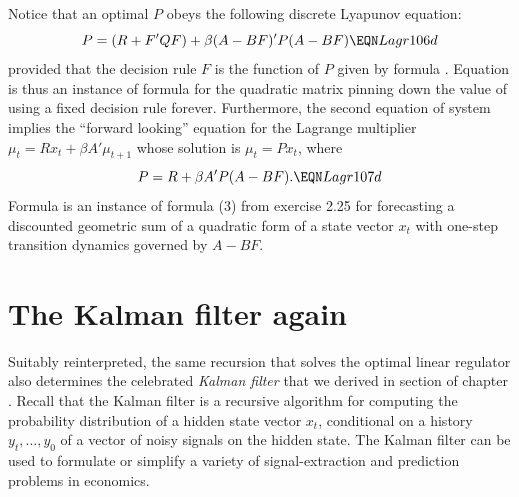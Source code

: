 Notice that an optimal $P$ obeys the following  discrete Lyapunov equation:
$$ P = (R + F' Q F) + \beta (A - B F)' P (A - BF)  \EQN Lagr106d $$
provided that the decision rule $F $ is the function of $P$ given by formula .
Equation  is thus an instance of formula  for the quadratic matrix pinning down the 
value of using a fixed decision rule forever.  
Furthermore, the second equation of system  implies the ``forward looking'' equation for the Lagrange multiplier $\mu_t = R x_t + \beta A' \mu_{t+1}$ whose
solution is $\mu_t = P x_t$, where
$$ P = R + \beta A' P (A - BF) .  \EQN Lagr107d $$
Formula  is an instance of formula (3) from  exercise 2.25 for forecasting
a discounted  geometric sum of a quadratic form of a state vector $x_t$ with one-step transition
dynamics governed by $A - BF$. 



\section{The Kalman filter again}\label{sec:Kalmanch4}%
  Suitably reinterpreted, the same recursion   that solves the optimal
linear regulator also determines the celebrated {\it Kalman filter} that we derived in section
of chapter .
%
%
Recall that the Kalman filter is a recursive algorithm
for computing  the probability distribution 
of a hidden state  vector $x_t$, 
conditional on 
a history $y_t, \ldots, y_0$ of a vector of noisy signals  on the
hidden state.   The Kalman filter can be used to formulate or
simplify a variety of signal-extraction and prediction
problems in economics.
%

